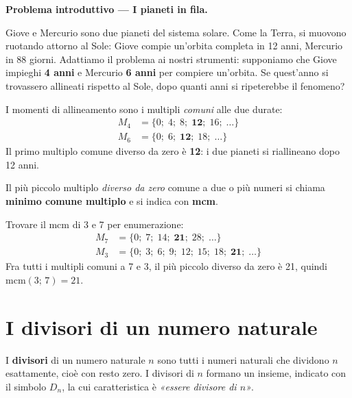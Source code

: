 \begin{esempio}
    \textbf{Problema introduttivo — I pianeti in fila.}

    Giove e Mercurio sono due pianeti del sistema solare. Come la Terra, si muovono
    ruotando attorno al Sole: Giove compie un'orbita completa in 12 anni, Mercurio
    in 88 giorni. Adattiamo il problema ai nostri strumenti: supponiamo che Giove
    impieghi \textbf{4 anni} e Mercurio \textbf{6 anni} per compiere un'orbita.
    Se quest'anno si trovassero allineati rispetto al Sole, dopo quanti anni si
    ripeterebbe il fenomeno?

    \medskip
    I momenti di allineamento sono i multipli \emph{comuni} alle due durate:
    \begin{align*}
        M_4 & = \{0;\; 4;\; 8;\; \mathbf{12};\; 16;\; \ldots\} \\
        M_6 & = \{0;\; 6;\; \mathbf{12};\; 18;\; \ldots\}
    \end{align*}
    Il primo multiplo comune diverso da zero è \textbf{12}: i due pianeti si
    riallineano dopo 12 anni.
\end{esempio}

\begin{definizione}
    Il più piccolo multiplo \emph{diverso da zero} comune a due o più numeri si
    chiama \textbf{minimo comune multiplo} e si indica con \textbf{mcm}.
\end{definizione}

\begin{esempio}
    Trovare il mcm di 3 e 7 per enumerazione:
    \begin{align*}
        M_7 & = \{0;\; 7;\; 14;\; \mathbf{21};\; 28;\; \ldots\}                 \\
        M_3 & = \{0;\; 3;\; 6;\; 9;\; 12;\; 15;\; 18;\; \mathbf{21};\; \ldots\}
    \end{align*}
    Fra tutti i multipli comuni a 7 e 3, il più piccolo diverso da zero è 21,
    quindi $\text{mcm}(3;\, 7) = 21$.
\end{esempio}

\section{I divisori di un numero naturale}

\begin{definizione}
    I \textbf{divisori} di un numero naturale $n$ sono tutti i numeri naturali che
    dividono $n$ esattamente, cioè con resto zero. I divisori di $n$ formano un
    insieme, indicato con il simbolo $D_n$, la cui caratteristica è
    \emph{«essere divisore di $n$»}.
\end{definizione}

